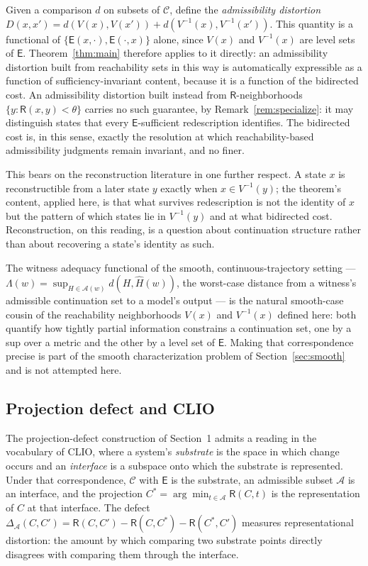 \documentclass[11pt]{article}
\theoremstyle{remark}
\newcommand{\C}{\mathcal{C}}
\newcommand{\A}{\mathcal{A}}
\newcommand{\R}{\mathsf{R}}
\newcommand{\E}{\mathsf{E}}
\begin{document}
Given a comparison $d$ on subsets of $\C$, define the
\emph{admissibility distortion}
$D(x,x')=d(V(x),V(x'))+d(V^{-1}(x),V^{-1}(x'))$. This quantity is a
functional of $\{\E(x,\cdot),\E(\cdot,x)\}$ alone, since $V(x)$ and
$V^{-1}(x)$ are level sets of $\E$. Theorem~\ref{thm:main} therefore
applies to it directly: an admissibility distortion built from
reachability sets in this way is automatically expressible as a
function of sufficiency-invariant content, because it is a function
of the bidirected cost. An admissibility distortion built instead from
$\R$-neighborhoods $\{y:\R(x,y)<\theta\}$ carries no such guarantee,
by Remark~\ref{rem:specialize}: it may distinguish states that every
$\E$-sufficient redescription identifies. The bidirected cost is, in
this sense, exactly the resolution at which reachability-based
admissibility judgments remain invariant, and no finer.

This bears on the reconstruction literature in one further respect.
A state $x$ is reconstructible from a later state $y$ exactly when
$x\in V^{-1}(y)$; the theorem's content, applied here, is that what
survives redescription is not the identity of $x$ but the pattern of
which states lie in $V^{-1}(y)$ and at what bidirected cost.
Reconstruction, on this reading, is a question about continuation
structure rather than about recovering a state's identity as such.

The witness adequacy functional of the smooth, continuous-trajectory
setting --- $\Lambda(w)=\sup_{H\in\A(w)}d(H,\hat H(w))$, the
worst-case distance from a witness's admissible continuation set to a
model's output --- is the natural smooth-case cousin of the
reachability neighborhoods $V(x)$ and $V^{-1}(x)$ defined here: both
quantify how tightly partial information constrains a continuation
set, one by a sup over a metric and the other by a level set of
$\E$. Making that correspondence precise is part of the smooth
characterization problem of Section~\ref{sec:smooth} and is not
attempted here.

\subsection{Projection defect and CLIO}\label{subsec:clio}

The projection-defect construction of Section~1 admits a reading in
the vocabulary of CLIO, where a system's \emph{substrate} is the
space in which change occurs and an \emph{interface} is a subspace
onto which the substrate is represented. Under that correspondence,
$\C$ with $\E$ is the substrate, an admissible subset $\A$ is an
interface, and the projection $C^{*}=\arg\min_{t\in\A}\R(C,t)$ is the
representation of $C$ at that interface. The defect
$\Delta_{\A}(C,C')=\R(C,C')-\R(C,C^{*})-\R(C^{*},C')$ measures
representational distortion: the amount by which comparing two
substrate points directly disagrees with comparing them through the
interface.
\end{document}

